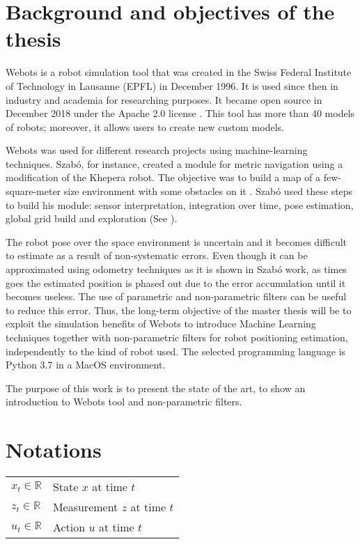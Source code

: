 \section{Background and objectives of the thesis}

Webots is a robot simulation tool that was created in the Swiss Federal Institute of Technology in Lausanne (EPFL) in December 1996. It is used since then in industry and academia for researching purposes. It became open source in December 2018 under the Apache 2.0 license \cite{cyberbotics}.  This tool has more than 40 models of robots; moreover, it allows users to create new custom models.


Webots was used for different research projects using machine-learning techniques. Szab\'{o}, for instance, created a module for metric navigation using a modification of the Khepera robot. The objective was to build a map of a few-square-meter size environment with some obstacles on it \cite{szabo}. Szab\'{o} used these steps to build his module: sensor interpretation, integration over time, pose estimation, global grid build and exploration (See \cite{thrun-1}).

The robot pose over the space environment is uncertain and it becomes difficult to estimate as a result of non-systematic errors. Even though it can be approximated using odometry techniques as it is shown in Szab\'{o} work, as times goes the estimated position is phased out due to the error accumulation until it becomes useless. The use of parametric and non-parametric filters can be useful to reduce this error. Thus, the long-term objective of the master thesis will be to exploit the simulation benefits of Webots to introduce Machine Learning techniques together with non-parametric filters for robot positioning estimation, independently to the kind of robot used. The selected programming language is Python 3.7 in a MacOS environment.

The purpose of this work is to present the state of the art, to show an introduction to Webots tool and non-parametric filters. 
\section{Notations}
\begin{flushleft}
\begin{tabular}{l l}
$x_t \in \mathbb{R}$ & State $x$ at time $t$\\
$z_t \in \mathbb{R}$  & Measurement $z$ at time $t$\\
$u_t \in \mathbb{R}$ & Action $u$ at time $t$\\
\end{tabular}
\end{flushleft}

